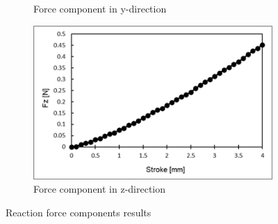 \begin{figure}
\begin{subfigure}[b]{0.45\textwidth}
    \caption{Force component in y-direction}
    \label{fig:forceyynu}
    \end{subfigure}
    \vspace{0.5cm}
    \begin{subfigure}[b]{0.45\textwidth}
    \centering
    \includegraphics[width=\textwidth]{Images/appendix/ynu/fig6forcestroke_c.png}
    \caption{Force component in z-direction}
    \label{fig:forcezynu}
    \end{subfigure}  
    \hspace{0.3cm}
    \caption{Reaction force components results}
    \label{fig:forcemeasurementynu}
\end{figure}

